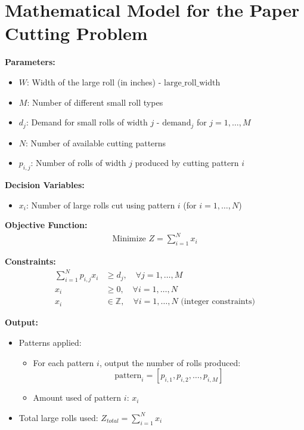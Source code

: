 \documentclass{article}
\begin{document}
\section*{Mathematical Model for the Paper Cutting Problem}

\textbf{Parameters:}
\begin{itemize}
    \item $W$: Width of the large roll (in inches) - \( \text{large\_roll\_width} \)
    \item $M$: Number of different small roll types
    \item $d_j$: Demand for small rolls of width $j$ - \( \text{demand}_j \) for \( j = 1, \ldots, M \)
    \item $N$: Number of available cutting patterns
    \item $p_{i,j}$: Number of rolls of width $j$ produced by cutting pattern $i$ 
\end{itemize}

\textbf{Decision Variables:}
\begin{itemize}
    \item $x_i$: Number of large rolls cut using pattern $i$ (for \( i = 1, \ldots, N \))
\end{itemize}

\textbf{Objective Function:}
\begin{align*}
    \text{Minimize } Z = \sum_{i=1}^{N} x_i
\end{align*}

\textbf{Constraints:}
\begin{align*}
    \sum_{i=1}^{N} p_{i,j} x_i & \geq d_j, \quad \forall j = 1, \ldots, M \\
    x_i & \geq 0, \quad \forall i = 1, \ldots, N \\
    x_i & \in \mathbb{Z}, \quad \forall i = 1, \ldots, N \text{ (integer constraints)}
\end{align*}

\textbf{Output:}
\begin{itemize}
    \item Patterns applied:
    \begin{itemize}
        \item For each pattern $i$, output the number of rolls produced:
        \[
        \text{pattern}_i = [p_{i,1}, p_{i,2}, \ldots, p_{i,M}]
        \]
        \item Amount used of pattern $i$: \( x_i \)
    \end{itemize}
    \item Total large rolls used: \( Z_{total} = \sum_{i=1}^{N} x_i \)
\end{itemize}
\end{document}
